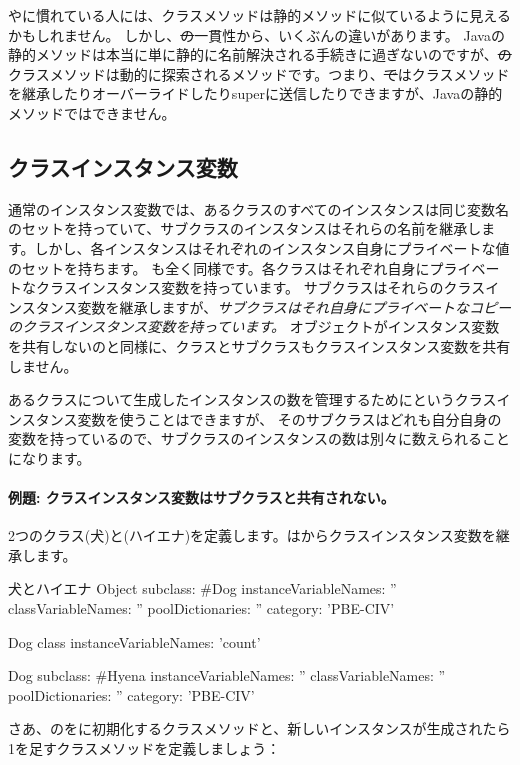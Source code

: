 \documentclass[a4paper,10pt,twoside]{book}
\begin{document}
やに慣れている人には、クラスメソッドは静的メソッドに似ているように見えるかもしれません。
しかし、\st の一貫性から、いくぶんの違いがあります。
Javaの静的メソッドは本当に単に静的に名前解決される手続きに過ぎないのですが、\st のクラスメソッドは動的に探索されるメソッドです。つまり、\st ではクラスメソッドを継承したりオーバーライドしたりsuperに送信したりできますが、Javaの静的メソッドではできません。

\subsection{クラスインスタンス変数}
通常のインスタンス変数では、あるクラスのすべてのインスタンスは同じ変数名のセットを持っていて、サブクラスのインスタンスはそれらの名前を継承します。しかし、各インスタンスはそれぞれのインスタンス自身にプライベートな値のセットを持ちます。
も全く同様です。各クラスはそれぞれ自身にプライベートなクラスインスタンス変数を持っています。
サブクラスはそれらのクラスインスタンス変数を継承しますが、\emph{サブクラスはそれ自身にプライベートなコピーのクラスインスタンス変数を持っています。}
オブジェクトがインスタンス変数を共有しないのと同様に、クラスとサブクラスもクラスインスタンス変数を共有しません。

あるクラスについて生成したインスタンスの数を管理するためにというクラスインスタンス変数を使うことはできますが、
そのサブクラスはどれも自分自身の変数を持っているので、サブクラスのインスタンスの数は別々に数えられることになります。

\paragraph{例題: クラスインスタンス変数はサブクラスと共有されない。}
2つのクラス(犬)と(ハイエナ)を定義します。はからクラスインスタンス変数を継承します。

\begin{classdef}[dog]{犬とハイエナ}
Object subclass: #Dog
	instanceVariableNames: ''
	classVariableNames: ''
	poolDictionaries: ''
	category: 'PBE-CIV'

Dog class
	instanceVariableNames: 'count'

Dog subclass: #Hyena
	instanceVariableNames: ''
	classVariableNames: ''
	poolDictionaries: ''
	category: 'PBE-CIV'
\end{classdef}

さあ、のをに初期化するクラスメソッドと、新しいインスタンスが生成されたら1を足すクラスメソッドを定義しましょう：
\end{document}
